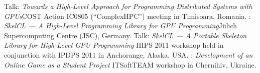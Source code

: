        {Talk: \emph{Towards a High-Level Approach for Programming Distributed
        Systems with GPUs}\newline \small COST Action IC0805 (``ComplexHPC'')
        meeting in Timisoara, Romania.}
       {: \emph{SkelCL --- A High-Level Programming Library for GPU
        Programming}\newline \small Jülich Supercomputing Centre (JSC), Germany.}
       {Talk: \emph{SkelCL --- A Portable Skeleton Library for High-Level
        GPU Programming}\newline
        \small HIPS 2011 workshop held in conjunction with IPDPS 2011 in
        Anchorange, Alaska, USA.}
       {: \emph{Development of an Online Game as a Student Project}\newline
        \small ITSoftTEAM workshop in Chernihiv, Ukraine.}
